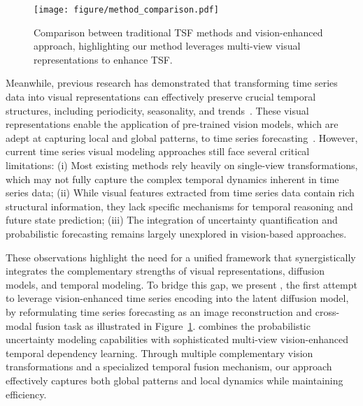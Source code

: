 \begin{figure}[!t]
  \centering
  \texttt{[image: figure/method\_comparison.pdf]}
  \caption{Comparison between traditional TSF methods and vision-enhanced approach, highlighting our method leverages multi-view visual representations to enhance TSF.}
\vspace{-1.5em}
\label{fig:method_comparison}
\end{figure}
Meanwhile, previous research has demonstrated that transforming time series data into visual representations can effectively preserve crucial temporal structures, including periodicity, seasonality, and trends~\cite{eckmann1995recurrence, Oord2016WaveNetAG,wang2015encoding}. These visual representations enable the application of pre-trained vision models, which are adept at capturing local and global patterns, to time series forecasting~\cite{wu2022timesnet,chen2024visionts}. However, current time series visual modeling approaches still face several critical limitations: (i) Most existing methods rely heavily on single-view transformations, which may not fully capture the complex temporal dynamics inherent in time series data; (ii) While visual features extracted from time series data contain rich structural information, they lack specific mechanisms for temporal reasoning and future state prediction; (iii) The integration of uncertainty quantification and probabilistic forecasting remains largely unexplored in vision-based approaches. 

These observations highlight the need for a unified framework that synergistically integrates the complementary strengths of visual representations, diffusion models, and temporal modeling. To bridge this gap, we present \model, the first attempt to leverage vision-enhanced time series encoding into the latent diffusion model, by reformulating time series forecasting as an image reconstruction and cross-modal fusion task as illustrated in Figure~\ref{fig:method_comparison}. \model combines the probabilistic uncertainty modeling capabilities with sophisticated multi-view vision-enhanced temporal dependency learning. Through multiple complementary vision transformations and a specialized temporal fusion mechanism, our approach effectively captures both global patterns and local dynamics while maintaining efficiency.

